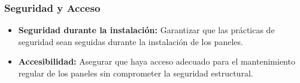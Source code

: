 \documentclass[a4paper,12pt]{article}
\begin{document}
\begin{Form}
\subsubsection*{Seguridad y Acceso}
\begin{itemize}
    \item \textbf{Seguridad durante la instalación:} Garantizar que las prácticas de seguridad sean seguidas durante la instalación de los paneles.
    \item \textbf{Accesibilidad:} Asegurar que haya acceso adecuado para el mantenimiento regular de los paneles sin comprometer la seguridad estructural.
\end{itemize}



\end{Form}
\end{document}
